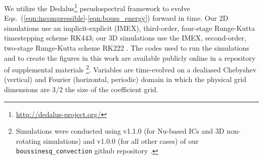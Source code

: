 \documentclass[aps, pre, onecolumn, nofootinbib, notitlepage, groupedaddress, amsfonts, amssymb, amsmath, longbibliography, superscriptaddress]{revtex4-1}
\newcommand{\ea}[1]{{\color{red} #1}}
\begin{document}
We utilize the Dedalus\footnote{\url{http://dedalus-project.org/}} pseudospectral framework \cite{burns&all2016, burns&all2019} to evolve Eqs.~(\ref{eqn:incompressible}-\ref{eqn:bouss_energy}) forward in time.
Our 2D simulations use an implicit-explicit (IMEX), third-order, four-stage Runge-Kutta timestepping scheme RK443; our 3D simulations use the \ea{IMEX}, second-order, two-stage Runge-Kutta scheme RK222 \cite{ascher&all1997}. 
The codes used to run the simulations and to create the figures in this work are available publicly online in a repository of supplemental materials \cite{anders&all2020a_supp}\footnote{Simulations were conducted using \ea{v1.1.0 (for Nu-based ICs and 3D non-rotating simulations) and} v1.0.0 \ea{(for all other cases)} of our \texttt{boussinesq\_convection} github repository \cite{code:boussinesq_convection}.}.
Variables are time-evolved on a dealiased Chebyshev (vertical) and Fourier (horizontal, periodic) domain in which the physical grid dimensions are 3/2 the size of the coefficient grid.  
\end{document}
